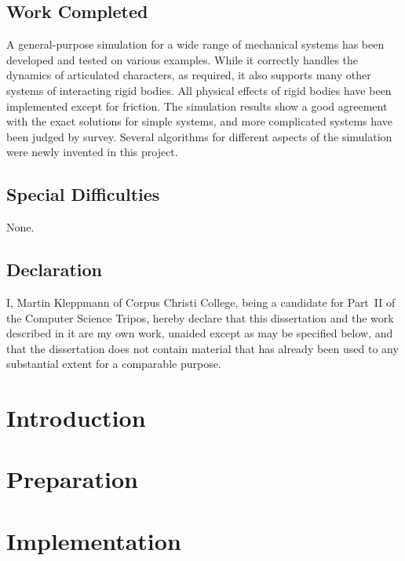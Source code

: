 \documentclass[twoside,notitlepage]{report}
\begin{document}
\section*{Work Completed}
A general-purpose simulation for a wide range of mechanical systems has been developed and tested
on various examples. While it correctly handles the dynamics of articulated characters, as
required, it also supports many other systems of interacting rigid bodies. All physical effects
of rigid bodies have been implemented except for friction. The simulation results show a good
agreement with the exact solutions for simple systems, and more complicated systems have been
judged by survey. Several algorithms for different aspects of the simulation were newly invented
in this project.

\section*{Special Difficulties}
None.

\newpage
\vspace*{60mm}
\section*{Declaration}

I, Martin Kleppmann of Corpus Christi College, being a candidate for Part~II of the Computer
Science Tripos, hereby declare that this dissertation and the work described in it are my own
work, unaided except as may be specified below, and that the dissertation does not contain
material that has already been used to any substantial extent for a comparable purpose.

\vspace{20mm}
\vspace{12mm}
\cleardoublepage

\tableofcontents
\chapter{Introduction}

\chapter{Preparation}




\chapter{Implementation}



\end{document}
